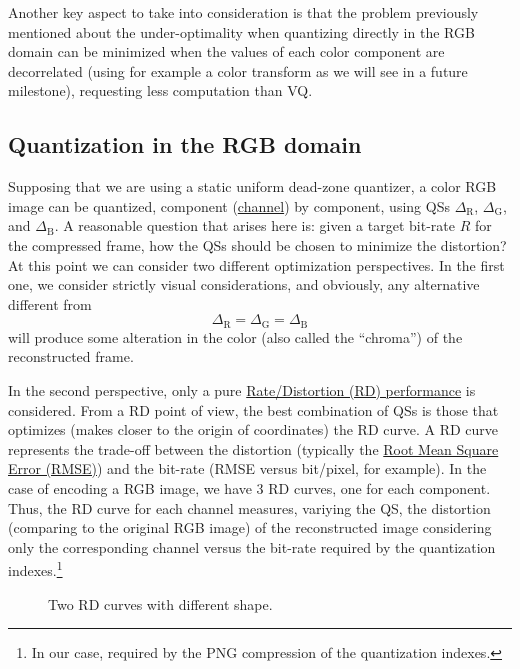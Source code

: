 Another key aspect to take into consideration is that the problem
previously mentioned about the under-optimality when quantizing
directly in the RGB domain can be minimized when the values of each
color component are decorrelated (using for example a color transform
as we will see in a future milestone), requesting less computation
than VQ.

\subsection{Quantization in the RGB domain}
Supposing that we are using a static uniform dead-zone quantizer, a
color RGB image can be quantized, component
(\href{https://en.wikipedia.org/wiki/Color_image}{channel}) by
component, using QSs $\Delta_{\text{R}}$, $\Delta_{\text{G}}$, and
$\Delta_{\text{B}}$. A reasonable question that arises here is: given
a target bit-rate $R$ for the compressed frame, how the QSs should be
chosen to minimize the distortion? At this point we can consider two
different optimization perspectives. In the first one, we consider
strictly visual considerations, and obviously, any alternative
different from
\begin{equation}
  \Delta_{\text{R}} = \Delta_{\text{G}} = \Delta_{\text{B}}
  \label{eq:simple_Q}
\end{equation}
will produce some alteration in the color (also called the
``chroma'') of the reconstructed frame.

In the second perspective, only a pure
\href{https://en.wikipedia.org/wiki/Rate-distortion_theory}{Rate/Distortion
  (RD) performance} is considered. From a RD point of view, the best
combination of QSs is those that optimizes (makes closer to the origin
of coordinates) the RD curve. A RD curve represents the trade-off
between the distortion (typically the
\href{https://en.wikipedia.org/wiki/Root-mean-square_deviation}{Root
  Mean Square Error (RMSE)}) and the bit-rate (RMSE versus bit/pixel,
for example). In the case of encoding a RGB image, we have 3 RD
curves, one for each component. Thus, the RD curve for each channel
measures, variying the QS, the distortion (comparing to the original
RGB image) of the reconstructed image considering only the
corresponding channel versus the bit-rate required by the quantization
indexes.\footnote{In our case, required by the PNG compression of the
quantization indexes.}

\begin{figure}
  \centering
  \caption{Two RD curves with different shape.}
  \label{fig:RD_slopes}
\end{figure}

